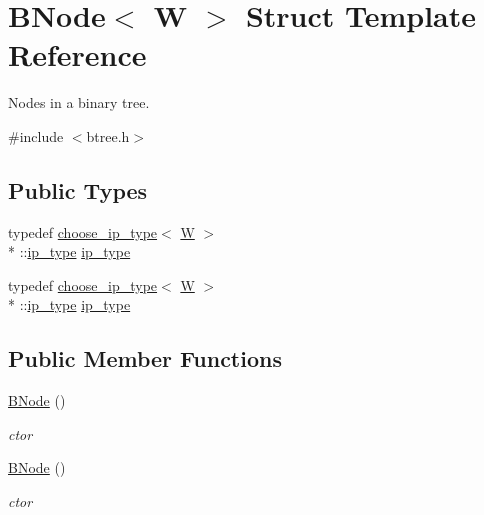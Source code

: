 \hypertarget{structBNode}{\section{B\-Node$<$ W $>$ Struct Template Reference}
\label{structBNode}
}


Nodes in a binary tree.  




{\ttfamily \#include $<$btree.\-h$>$}

\subsection*{Public Types}
\begin{DoxyCompactItemize}
\item 
typedef \hyperlink{types_8h_structchoose__ip__type}{choose\-\_\-ip\-\_\-type}$<$ \hyperlink{test__u128_8cpp_ab21b528bc38899d04d3a7053e52fb797}{W} $>$\\*
\-::\hyperlink{structBNode_a1a533a579c88e8e8b7e987da5ebccc55}{ip\-\_\-type} \hyperlink{structBNode_a1a533a579c88e8e8b7e987da5ebccc55}{ip\-\_\-type}
\item 
typedef \hyperlink{types_8h_structchoose__ip__type}{choose\-\_\-ip\-\_\-type}$<$ \hyperlink{test__u128_8cpp_ab21b528bc38899d04d3a7053e52fb797}{W} $>$\\*
\-::\hyperlink{structBNode_a1a533a579c88e8e8b7e987da5ebccc55}{ip\-\_\-type} \hyperlink{structBNode_a1a533a579c88e8e8b7e987da5ebccc55}{ip\-\_\-type}
\end{DoxyCompactItemize}
\subsection*{Public Member Functions}
\begin{DoxyCompactItemize}
\item 
\hyperlink{structBNode_a965ac3a5273a78d323b07d3b8e463a18}{B\-Node} ()
\begin{DoxyCompactList}\small\item\em ctor \end{DoxyCompactList}\item 
\hyperlink{structBNode_a965ac3a5273a78d323b07d3b8e463a18}{B\-Node} ()
\begin{DoxyCompactList}\small\item\em ctor \end{DoxyCompactList}\end{DoxyCompactItemize}
